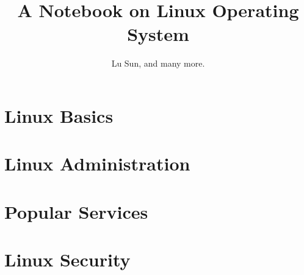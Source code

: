 

\makeindex



\frontmatter

\title{A Notebook on Linux Operating System}
\author{Lu Sun, and many more.}

\maketitle


\tableofcontents


\listoffigures
\listoftables

\mainmatter

\part{Linux Basics}







\part{Linux Administration}




\part{Popular Services}
 







\part{Linux Security}



\appendix












\printindex


